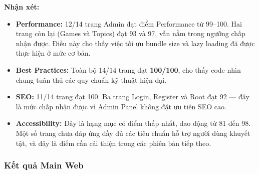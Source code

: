 \textbf{Nhận xét:}
\begin{itemize}[leftmargin=*]
  \item \textbf{Performance:} 12/14 trang Admin đạt điểm Performance từ 99--100.
        Hai trang còn lại (Games và Topics) đạt 93 và 97, vẫn nằm trong ngưỡng chấp
        nhận được. Điều này cho thấy việc tối ưu bundle size và lazy loading đã được
        thực hiện ở mức cơ bản.
  \item \textbf{Best Practices:} Toàn bộ 14/14 trang đạt \textbf{100/100}, cho thấy
        code nhìn chung tuân thủ các quy chuẩn kỹ thuật hiện đại.
  \item \textbf{SEO:} 11/14 trang đạt 100. Ba trang Login, Register và Root đạt 92 ---
        đây là mức chấp nhận được vì Admin Panel không đặt ưu tiên SEO cao.
  \item \textbf{Accessibility:} Đây là hạng mục có điểm thấp nhất, dao động từ 81 đến
        98. Một số trang chưa đáp ứng đầy đủ các tiêu chuẩn hỗ trợ người dùng khuyết
        tật, và đây là điểm cần cải thiện trong các phiên bản tiếp theo.
\end{itemize}

\subsubsection{Kết quả Main Web}

